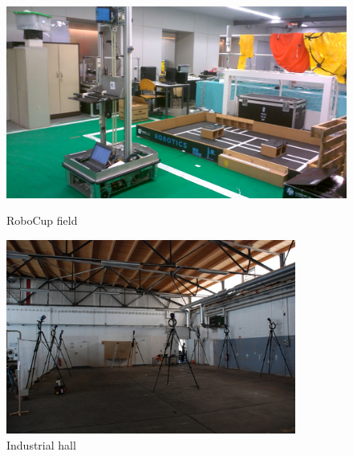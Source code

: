 \documentclass[9pt,a4paper]{extarticle}
\begin{document}
\begin{multicols}{2}
\begin{figure}[H]
	\centering
	\begin{minipage}[b]{0.23\textwidth}
		\centering
		\includegraphics[width=\textwidth]{jarvis-environment-front-right}
		\caption{\small RoboCup field}
		\label{fig:jarvis-environment}
	\end{minipage}\hfill
	\begin{minipage}[b]{0.23\textwidth}
		\centering
		\includegraphics[width=0.85\textwidth]{industrial-hall}
		\caption{\small Industrial hall \cite{Sturm2012}}
		\label{fig:pioneer-environment}
	\end{minipage}
\end{figure}



\end{multicols}
\end{document}
